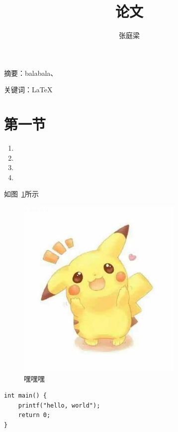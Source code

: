 \documentclass{ctexart} %
\title{论文}
\author{张庭梁}
\begin{document}
\maketitle

摘要：balabala、

关键词：\LaTeX


\section{第一节}

\begin{enumerate}
\item 
\item 
\item
\item
\end{enumerate}

如图~\ref{1}所示
\begin{figure}[htbp]
\small
\centering
\includegraphics[width=8cm]{1.jpg}
\caption{嘿嘿嘿} 
\label{1}
\end{figure}

\begin{verbatim}
int main() {
    printf("hello, world");
    return 0;
}
\end{verbatim}





\end{document}
